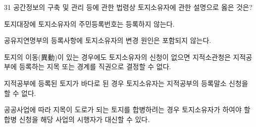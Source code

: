 \begin{question}{31}
공간정보의 구축 및 관리 등에 관한 법령상 토지소유자에 관한 설명으로 옳은 것은?
\begin{choices}
  \item 토지대장에 토지소유자의 주민등록번호는 등록하지 않는다.
  \item 공유지연명부의 등록사항에 토지소유자의 변경 원인은 포함되지 않는다.
  \item 토지의 이동(異動)이 있는 경우에도 토지소유자의 신청이 없으면 지적소관청은 지적공부에 등록하는 지목 또는 경계를 직권으로 결정할 수 없다.
  \item 지적공부에 등록된 토지가 바다로 된 경우 토지소유자는 지적공부의 등록말소 신청을 할 수 없다.
  \item 공공사업에 따라 지목이 도로가 되는 토지를 합병하려는 경우 토지소유자가 하여야 할 합병 신청을 해당 사업의 시행자가 대신할 수 있다.
\end{choices}
\end{question}
